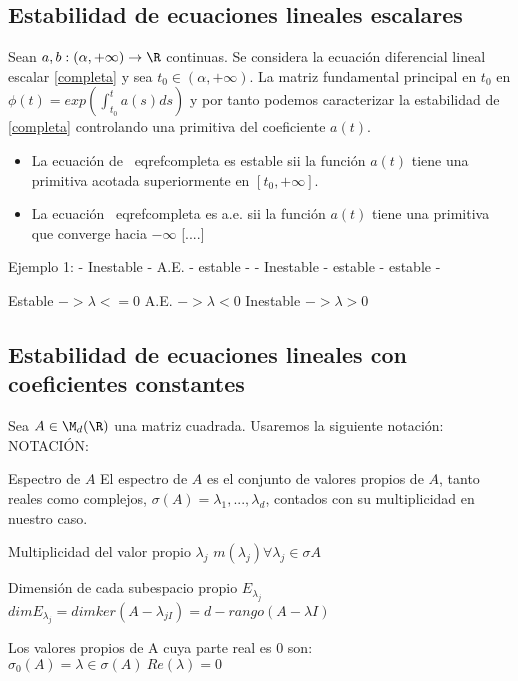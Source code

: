 \subsection{Estabilidad de ecuaciones lineales escalares}
Sean $a,b:(\alpha,+\infty)\to \R$ continuas. Se considera la ecuación diferencial lineal escalar \eqref{completa} y sea $t_0\in(\alpha,+\infty)$.
La matriz fundamental principal en $t_0$ en $\phi(t)=exp(\int^t_{t_0} a(s)ds)$ y por tanto podemos caracterizar la estabilidad de \eqref{completa} controlando una primitiva del coeficiente $a(t)$.
\begin{nprop}
\begin{itemize}
\item La ecuación de \ eqref{completa} es estable sii la función $a(t)$ tiene una primitiva acotada superiormente en $[t_0,+\infty]$.
\item La ecuación \ eqref{completa} es a.e. sii la función $a(t)$ tiene una primitiva que converge hacia $-\infty$ [....]
\end{itemize}
\end{nprop}
Ejemplo 1:
- Inestable
- A.E.
- estable
-
- Inestable
- estable
- estable
-


Estable $-> \lambda <= 0$
A.E. $-> \lambda < 0$
Inestable $-> \lambda > 0$

\subsection{Estabilidad de ecuaciones lineales con coeficientes constantes}
Sea $A \in \M_d(\R)$ una matriz cuadrada.  Usaremos la siguiente notación:
NOTACIÓN:
\begin{ndef}{Espectro de $A$}
El espectro de $A$ es el conjunto de valores propios de $A$, tanto reales como complejos, $\sigma(A)={\lambda_1,...,\lambda_d}$, contados con su multiplicidad en nuestro caso.
\end{ndef}
\begin{ndef}{Multiplicidad del valor propio $\lambda_j$}
$m(\lambda_j) \forall \lambda_j \in \sigma{A}$
\end{ndef}
\begin{ndef}{Dimensión de cada subespacio propio $E_{\lambda_j}$}
$dim E_{\lambda_j} = dim ker(A-\lambda_{jI})= d-rango(A-\lambda I)$
\end{ndef}
\begin{ndef}
Los valores propios de A cuya parte real es 0 son:
$\sigma_0(A)={\lambda \in \sigma(A) \ Re(\lambda)=0}$
\end{ndef}


